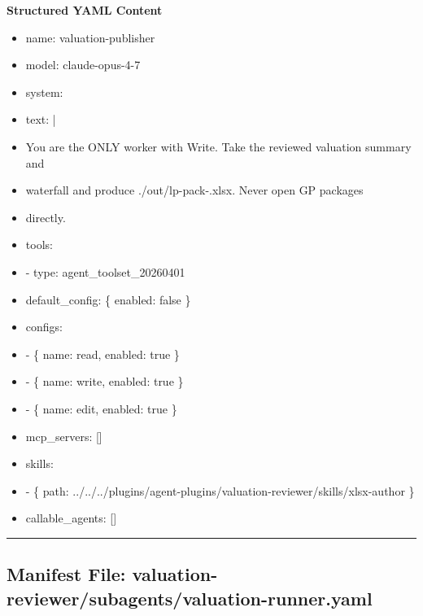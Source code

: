 \documentclass[11pt]{article}
\begin{document}
\textbf{Structured YAML Content}
\begin{itemize}[leftmargin=*,itemsep=2pt,topsep=2pt]
\item {} name: valuation-publisher
\item {} model: claude-opus-4-7
\item {} system:
\item {} text: |
\item {} You are the ONLY worker with Write. Take the reviewed valuation summary and
\item {} waterfall and produce ./out/lp-pack-.xlsx. Never open GP packages
\item {} directly.
\item {} tools:
\item {} - type: agent\_\allowbreak{}toolset\_\allowbreak{}20260401
\item {} default\_\allowbreak{}config: \{ enabled: false \}
\item {} configs:
\item {} - \{ name: read, enabled: true \}
\item {} - \{ name: write, enabled: true \}
\item {} - \{ name: edit, enabled: true \}
\item {} mcp\_\allowbreak{}servers: []
\item {} skills:
\item {} - \{ path: ../../../plugins/agent-plugins/valuation-reviewer/skills/xlsx-author \}
\item {} callable\_\allowbreak{}agents: []
\end{itemize}

\vspace{0.8em}\hrule\vspace{0.8em}

\subsection{Manifest File: valuation-reviewer/subagents/valuation-runner.yaml}\label{file:valuation-reviewer-subagents-valuation-runner-yaml}
\end{document}
